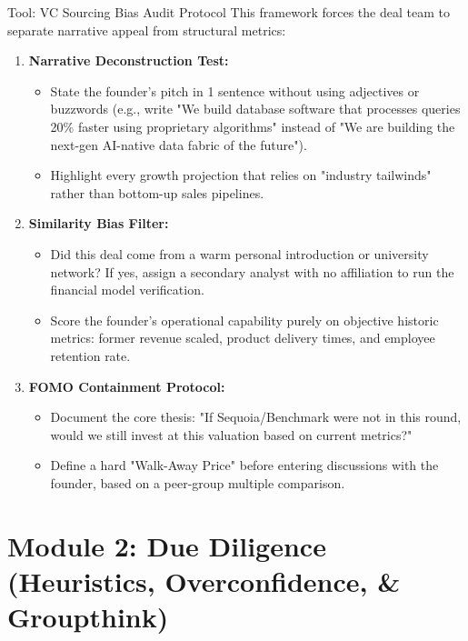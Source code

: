 \documentclass[11pt,a4paper]{article}
\begin{document}
\begin{pevcbox}{Tool: VC Sourcing Bias Audit Protocol}
This framework forces the deal team to separate narrative appeal from structural metrics:
\begin{enumerate}
    \item \textbf{Narrative Deconstruction Test:}
    \begin{itemize}
        \item State the founder's pitch in 1 sentence without using adjectives or buzzwords (e.g., write "We build database software that processes queries 20\% faster using proprietary algorithms" instead of "We are building the next-gen AI-native data fabric of the future").
        \item Highlight every growth projection that relies on "industry tailwinds" rather than bottom-up sales pipelines.
    \end{itemize}
    \item \textbf{Similarity Bias Filter:}
    \begin{itemize}
        \item Did this deal come from a warm personal introduction or university network? If yes, assign a secondary analyst with no affiliation to run the financial model verification.
        \item Score the founder's operational capability purely on objective historic metrics: former revenue scaled, product delivery times, and employee retention rate.
    \end{itemize}
    \item \textbf{FOMO Containment Protocol:}
    \begin{itemize}
        \item Document the core thesis: "If Sequoia/Benchmark were not in this round, would we still invest at this valuation based on current metrics?"
        \item Define a hard "Walk-Away Price" before entering discussions with the founder, based on a peer-group multiple comparison.
    \end{itemize}
\end{enumerate}
\end{pevcbox}

\newpage
\section{Module 2: Due Diligence (Heuristics, Overconfidence, \& Groupthink)}
\end{document}
